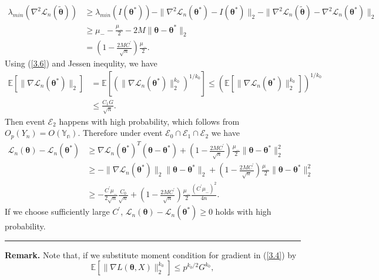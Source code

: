 \documentclass[12pt]{article}
\numberwithin{equation}{section}
\newenvironment{proof}{{\bf Proof:}}{\hfill\rule{2mm}{2mm}}
\begin{document}
\begin{proof}
	\begin{align*}
		\lambda_{min}\left(\nabla^2\mathcal{L}_n(\tilde{\boldsymbol{\theta}})\right)&\geq \lambda_{min}\left(I(\boldsymbol{\theta}^{*})\right)-\|\nabla^2\mathcal{L}_n(\boldsymbol{\theta}^{*})-I(\boldsymbol{\theta}^{*})\|_2-\|\nabla^2\mathcal{L}_n(\tilde{\boldsymbol{\theta}})-\nabla^2\mathcal{L}_n(\boldsymbol{\theta}^{*})\|_2\\
		&\geq \mu_{-}-\frac{\mu_{-}}{2}-2M\|\boldsymbol{\theta}-\boldsymbol{\theta}^{*}\|_2\\
		&= (1-\frac{2MC^{'}}{\sqrt{n}})\frac{\mu_{-}}{2}.
	\end{align*}
	Using (\ref{3.6}) and Jessen inequlity, we have
	\begin{align*}
		\mathbb{E}\left[\|\nabla\mathcal{L}_n(\boldsymbol{\theta}^{*})\|_2\right]&=\mathbb{E}\left[\left(\|\nabla\mathcal{L}_n(\boldsymbol{\theta}^{*})\|_2^{k_0}\right)^{1/k_0}\right]\leq \left(\mathbb{E}\left[\|\nabla\mathcal{L}_n(\boldsymbol{\theta}^{*})\|_2^{k_0}\right]\right)^{1/k_0}\\
		&\leq \frac{C_1G}{\sqrt{n}}.
	\end{align*}
	Then event $\mathcal{E}_2$ happens with high probability, which follows from $O_p(Y_n)=O(\mathbb{Y_n})$. Therefore under event $\mathcal{E}_0\cap \mathcal{E}_1\cap \mathcal{E}_2$ we have
	\begin{align*}
	\mathcal{L}_n\left(\boldsymbol{\theta}\right)-\mathcal{L}_n\left(\boldsymbol{\theta}^{*}\right)&\geq \nabla\mathcal{L}_n\left(\boldsymbol{\theta}^{*}\right)^T\left(\boldsymbol{\theta}-\boldsymbol{\theta}^{*}\right)+(1-\frac{2MC^{'}}{\sqrt{n}})\frac{\mu_{-}}{2}\|\boldsymbol{\theta}-\boldsymbol{\theta}^{*}\|_2^2\\
	&\geq -\|\nabla\mathcal{L}_n\left(\boldsymbol{\theta}^{*}\right)\|_2\|\boldsymbol{\theta}-\boldsymbol{\theta}^{*}\|_2+(1-\frac{2MC^{'}}{\sqrt{n}})\frac{\mu_{-}}{2}\|\boldsymbol{\theta}-\boldsymbol{\theta}^{*}\|_2^2\\
	&\geq -\frac{C^{'}\mu_{-}}{2\sqrt{n}}\frac{C_0}{\sqrt{n}}+(1-\frac{2MC^{'}}{\sqrt{n}})\frac{\mu_{-}}{2}\frac{(C^{'}\mu_{-})^2}{4n}.
	\end{align*}
	If we choose sufficiently large $C^{'}$, $\mathcal{L}_n\left(\boldsymbol{\theta}\right)-\mathcal{L}_n\left(\boldsymbol{\theta}^{*}\right)\geq 0$ holds with high probability.
\end{proof}\newline
\textbf{Remark. }Note that, if we substitute moment condition for gradient in (\ref{3.4}) by
$$
\mathbb{E}\left[\|\nabla L(\boldsymbol{\theta},X)\|_2^{k_0}\right]\leq p^{k_0/2}G^{k_0},
$$
\end{document}
